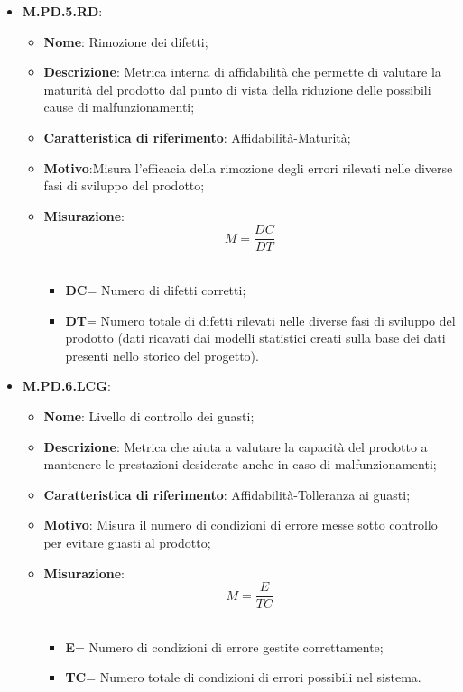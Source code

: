 \documentclass[10pt, a4paper]{article}
\begin{document}
\begin{itemize}
\begin{itemize}
    \end{itemize}


    \item \textbf{M.PD.5.RD}:
    \begin{itemize}
        \item \textbf{Nome}: Rimozione dei difetti;
        \item \textbf{Descrizione}: Metrica interna di affidabilità che permette di valutare la maturità del prodotto dal punto di vista della riduzione delle possibili cause di malfunzionamenti;
        \item \textbf{Caratteristica di riferimento}: Affidabilità-Maturità;
        \item \textbf{Motivo}:Misura l'efficacia della rimozione degli errori rilevati nelle diverse fasi di sviluppo del prodotto; 
       \item \textbf{Misurazione}:   \[ M=\frac{DC}{DT} \] \\
       \begin{itemize}
           \item \textbf{DC}= Numero di difetti corretti;
           \item \textbf{DT}= Numero totale di difetti rilevati nelle diverse fasi di sviluppo del prodotto (dati ricavati dai modelli statistici creati sulla base dei dati presenti nello storico del progetto).\\
       \end{itemize}
    \end{itemize}

    
    \item \textbf{M.PD.6.LCG}:
    \begin{itemize}
        \item \textbf{Nome}: Livello di controllo dei guasti;
        \item \textbf{Descrizione}: Metrica che aiuta a valutare la capacità del prodotto a mantenere le prestazioni desiderate anche in caso di malfunzionamenti;
        \item \textbf{Caratteristica di riferimento}: Affidabilità-Tolleranza ai guasti;
        \item \textbf{Motivo}: Misura il numero di condizioni di errore messe sotto controllo per evitare guasti al prodotto; 
       \item \textbf{Misurazione}:   \[ M=\frac{E}{TC} \] \\
       \begin{itemize}
           \item \textbf{E}= Numero di condizioni di errore gestite correttamente;
           \item \textbf{TC}= Numero totale di condizioni di errori possibili nel sistema.\\
       \end{itemize}
    \end{itemize}




\end{itemize}
\end{document}
